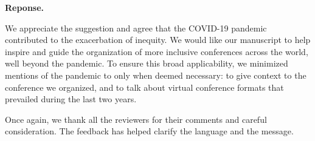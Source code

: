 \documentclass{article}
\newenvironment{Reply}{\noindent\color{BlueViolet}\textbf{Reponse.}}{\vspace{1em}}
\begin{document}
\begin{Reply}

    We appreciate the suggestion and agree that the COVID-19 pandemic contributed to the exacerbation of inequity. 
    We would like our manuscript to help inspire and guide the organization of more inclusive conferences across the world, well beyond the pandemic. To ensure this broad applicability, we minimized mentions of the pandemic to only when deemed necessary: to give context to the conference we organized, and to talk about virtual conference formats that prevailed during the last two years.  


    Once again, we thank all the reviewers for their comments and careful consideration.  The feedback has helped clarify the language and the message.
\end{Reply}
\end{document}

